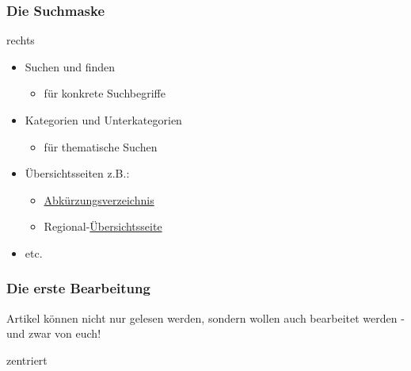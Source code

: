 \documentclass{beamer}
\begin{document}
\begin{frame}
  \frametitle{Die Suchmaske}

  rechts
  \begin{itemize}
    \item Suchen und finden

    \begin{itemize}
      \item für konkrete Suchbegriffe
    \end{itemize}
    \item Kategorien und Unterkategorien

    \begin{itemize}
      \item für thematische Suchen
    \end{itemize}
    \item Übersichtsseiten z.B.:

    \begin{itemize}
      \item \href{http://wiki.stura.htw-dresden.de/index.php/Kategorie:Abk\%C3\%BCrzung}{Abkürzungsverzeichnis}
      \item Regional-\href{http://food.the-empire.de/index.php/Hauptseite}{Übersichtsseite}
    \end{itemize}
    \item etc.
  \end{itemize}
\end{frame}


\begin{frame}
  \frametitle{Die erste Bearbeitung}
  Artikel können nicht nur gelesen werden, sondern wollen auch bearbeitet
  werden - und zwar von euch!

  zentriert
\end{frame}
\end{document}
